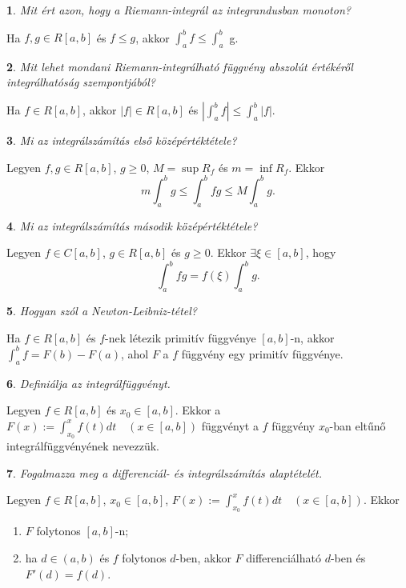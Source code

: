 \documentclass[a4paper]{article}
\theoremstyle{qstyle}
\newtheorem{question}{}{}
\begin{document}
	\begin{question}
		Mit ért azon, hogy a Riemann-integrál az integrandusban monoton?
	\end{question}
	Ha $f,g \in R[a,b]$ és $f \le g$, akkor $\int_{a}^{b} f \le \int_{a}^{b}$ g.
	
	\begin{question}
		Mit lehet mondani Riemann-integrálható függvény abszolút értékéről integrálhatóság
		szempontjából?
	\end{question}
	Ha $f \in R[a,b]$, akkor $|f| \in R[a,b]$ és $|\int_{a}^{b} f| \le \int_{a}^{b} |f|$.
	
	\begin{question}
		Mi az integrálszámítás első középértéktétele?  
	\end{question}
	Legyen $f,g \in R[a,b]$, $g \ge 0$, $M = \sup R_{f}$ és $m = \inf R_{f}$. Ekkor
	$$
	m \int_{a}^{b} g \le \int_{a}^{b} fg \le M \int_{a}^{b} g \text{.}
	$$
	
	\begin{question}
		Mi az integrálszámítás második középértéktétele? 
	\end{question}
	Legyen $f \in C[a,b]$, $g \in R[a,b]$ és $g \ge 0$. Ekkor $\exists \xi \in [a,b]$, hogy
	$$
	\int_{a}^{b} fg = f(\xi) \int_{a}^{b} g \text{.}
	$$
	
	\begin{question}
		Hogyan szól a Newton-Leibniz-tétel? 
	\end{question}
	Ha $f \in R[a,b]$ és $f$-nek létezik primitív függvénye $[a,b]$-n, akkor $\int_{a}^{b} f = F(b) - F(a)$, ahol $F$ a $f$ függvény egy primitív függvénye.
	
	\begin{question}
		Definiálja az integrálfüggvényt.
	\end{question}
	Legyen $f \in R[a,b]$ és $x_{0} \in [a,b]$. Ekkor a $F(x) := \int_{x_{0}}^{x} f(t)dt \quad (x \in [a,b])$ függvényt a $f$ függvény $x_{0}$-ban eltűnő integrálfüggvényének nevezzük.
	
	\begin{question}
		Fogalmazza meg a differenciál- és integrálszámítás alaptételét.
	\end{question}
	Legyen $f \in R[a,b]$, $x_{0} \in [a,b]$, $F(x) := \int_{x_{0}}^{x} f(t)dt \quad (x \in [a,b])$. Ekkor
	\begin{enumerate}
		\item $F$ folytonos $[a,b]$-n;
		\item ha $d \in (a,b)$ és $f$ folytonos $d$-ben, akkor $F$ differenciálható $d$-ben és $F'(d) = f(d)$.
	\end{enumerate}
	
\end{document}
